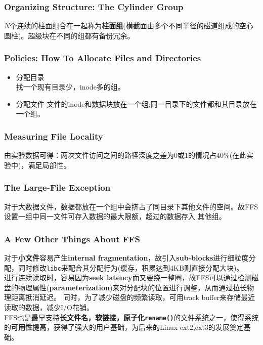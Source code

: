 \documentclass{article}
\begin{document}
\subsubsection{Organizing Structure: The Cylinder Group}
$N$个连续的柱面组合在一起称为\textbf{柱面组}(横截面由多个不同半径的磁道组成的空心圆柱)。超级块在不同的组都有备份冗余。
\subsubsection{Policies: How To Allocate Files and Directories}
\begin{itemize}
    \item 分配目录 \\
    找一个现有目录少，inode多的组。
    \item 分配文件
    文件的inode和数据块放在一个组;同一目录下的文件都和其目录放在一个组。
\end{itemize}
\subsubsection{Measuring File Locality}
由实验数据可得：两次文件访问之间的路径深度之差为$0$或$1$的情况占$40\%$(在此实验中)，满足局部性。
\subsubsection{The Large-File Exception}
对于大数据文件，数据都放在一个组中会挤占了同目录下其他文件的空间。故FFS设置一组中同一文件可存入数据的最大限额，超过的数据存入
其他组。
\subsubsection{A Few Other Things About FFS}
对于\textbf{小文件}容易产生\textbf{internal fragmentation}，故引入\textbf{sub-blocks}进行细粒度分配，同时修改\texttt{libc}来配合其分配行为(缓存，积累达到4KB则直接分配大块)。 \\
\indent 进行连续读取时，容易因为\textbf{seek latency}而又要绕一整圈，故FFS可以通过检测磁盘的物理属性(\textbf{parameterization})来对分配块的位置进行调整，从而通过拉长物理距离抵消延迟。
同时，为了减少磁盘的频繁读取，可用track buffer来存储最近读取的数据，减少I/O花销。\\
\indent FFS也是最早支持\textbf{长文件名，软链接，原子化\texttt{rename()}}的文件系统之一，使得系统的\textbf{可用性}提高，获得了强大的用户基础，为后来的Linux ext2,ext3的发展奠定基础。
\end{document}
